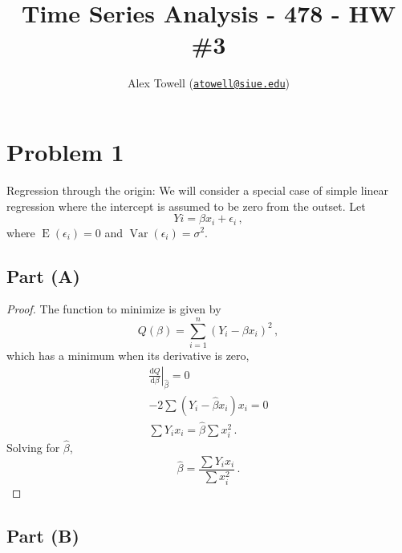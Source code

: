 \documentclass[
]{article}
\title{Time Series Analysis - 478 - HW \#3}
\author{Alex Towell
(\href{mailto:atowell@siue.edu}{\nolinkurl{atowell@siue.edu}})}
\date{}
\begin{document}
\maketitle

\newcommand{\var}{\operatorname{Var}}
\newcommand{\expect}{\operatorname{E}}
\newcommand{\corr}{\operatorname{Corr}}
\newcommand{\cov}{\operatorname{Cov}}
\newcommand{\ssr}{\operatorname{SSR}}
\newcommand{\se}{\operatorname{SE}}
\newcommand{\mat}[1]{\mathbf{#1}} 
\newcommand{\eval}[2]{\left. #1 \right\vert_{#2}}

\hypertarget{problem-1}{%
\section{Problem 1}\label{problem-1}}

Regression through the origin: We will consider a special case of simple
linear regression where the intercept is assumed to be zero from the
outset. Let \[
   Y i = \beta x_i + \epsilon_i\,,
\] where \(\operatorname{E}(\epsilon_i) = 0\) and
\(\operatorname{Var}(\epsilon_i) = \sigma^2\).

\hypertarget{part-a}{%
\subsection{Part (A)}\label{part-a}}


\begin{proof}
The function to minimize is given by
\begin{equation}
   Q(\beta) = \sum_{i=1}^{n} (Y_i - \beta x_i)^2\,,
\end{equation}
which has a minimum when its derivative is zero,
\begin{align*}
   \left. \frac{\mathrm{d}Q}{\mathrm{d}\beta} \right\vert_{\hat\beta} = 0\\
   -2 \sum (Y_i - \hat\beta x_i) x_i = 0\\
   \sum Y_i x_i = \hat\beta \sum x_i^2\,.
\end{align*}
Solving for $\hat\beta$,
\begin{equation}
   \hat\beta = \frac{ \sum Y_i x_i }{\sum x_i^2}\,.
\end{equation}
\end{proof}

\hypertarget{part-b}{%
\subsection{Part (B)}\label{part-b}}
\end{document}
